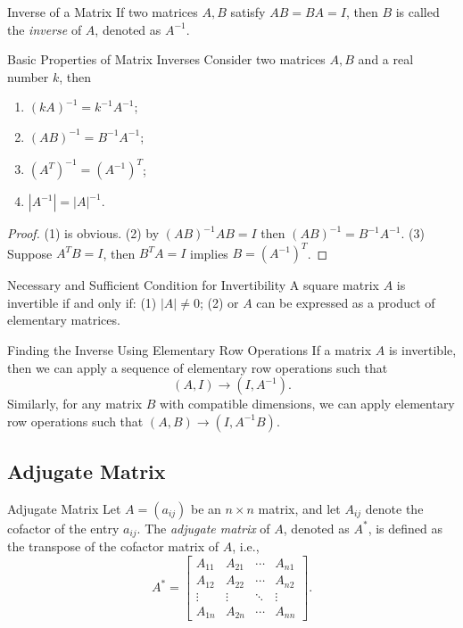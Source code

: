\begin{definition}{Inverse of a Matrix}{}
  If two matrices $A, B$ satisfy $AB = BA = I$,
  then $B$ is called the \emph{inverse} of $A$, denoted as $A^{-1}$.
\end{definition}

\begin{proposition}{Basic Properties of Matrix Inverses}{}
  Consider two matrices $A, B$ and a real number $k$, then
  \begin{enumerate}
  \item $(kA)^{-1} = k^{-1}A^{-1}$;
  \item $(AB)^{-1} = B^{-1} A^{-1}$;
  \item $(A^T)^{-1} = (A^{-1})^T$;
  \item $|A^{-1}| = |A|^{-1}$.
  \end{enumerate}
\end{proposition}

\begin{proof}
  (1) is obvious.
  (2) by $(AB)^{-1}AB = I$ then $(AB)^{-1} = B^{-1}A^{-1}$.
  (3) Suppose $A^TB = I$, then $B^TA = I$ implies $B = (A^{-1})^T$.
\end{proof}

\begin{proposition}{Necessary and Sufficient Condition for Invertibility}{}
  A square matrix $A$ is invertible if and only if:
  (1) $|A| \neq 0$;
  (2) or $A$ can be expressed as a product of elementary matrices.
\end{proposition}

\begin{proposition}{Finding the Inverse Using Elementary Row Operations}{}
  If a matrix $A$ is invertible, then we can apply a sequence of
  elementary row operations such that
  \begin{equation}
    (A, I) \rightarrow (I, A^{-1}).
  \end{equation}
  Similarly, for any matrix $B$ with compatible dimensions,
  we can apply elementary row operations such that $(A, B)
  \rightarrow (I, A^{-1}B)$.
\end{proposition}

\subsection{Adjugate Matrix}


\begin{definition}{Adjugate Matrix}{}
  Let $A = (a_{ij})$ be an $n \times n$ matrix, and let $A_{ij}$ denote
  the cofactor of the entry $a_{ij}$.
  The \emph{adjugate matrix} of $A$, denoted as $A^{\ast}$,
  is defined as the transpose of the cofactor matrix of $A$, i.e.,
  \begin{equation}
    A^*=\begin{bmatrix}A_{11}&A_{21}&\cdots&A_{n1}\\A_{12}&A_{22}&\cdots&A_{n2}\\\vdots&\vdots&\ddots&\vdots\\A_{1n}&A_{2n}&\cdots&A_{nn}\end{bmatrix}.
  \end{equation}
\end{definition}

